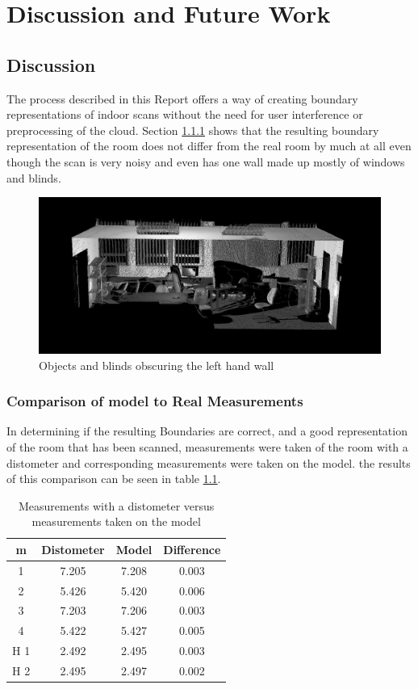 \chapter{Discussion and Future Work}
\section{Discussion}
	\label{discussion}
	The process described in this Report offers a way of creating boundary representations of indoor scans without the need for user interference or preprocessing of the cloud. Section \ref{Comparison} shows that the resulting boundary representation of the room does not differ from the real room by much at all even though the scan is very noisy and even has one wall made up mostly of windows and blinds. 
	
	\begin{figure}[H]
	\centering
	\includegraphics[width=0.9\linewidth]{"Includes/images/Results/Messy Wall"}
	\caption{Objects and blinds obscuring the left hand wall}
	\label{fig:MessyWall}
	\end{figure}
	
	
	\subsection{Comparison of model to Real Measurements}
		\label{Comparison}
		In determining if the resulting Boundaries are correct, and a good representation of the room that has been scanned, measurements were taken of the room with a distometer and corresponding measurements were taken on the model. the results of this comparison can be seen in table \ref{MeasurmensTable}. 
		
		\begin{table}[H]
			\centering
			\begin{tabular}{|c|c|c|c|}
				\hline m & Distometer & Model & Difference \\ 
				\hline 1 & 7.205 & 7.208 & 0.003 \\ 
				\hline 2 & 5.426 & 5.420 & 0.006 \\ 
				\hline 3 & 7.203 & 7.206 & 0.003 \\ 
				\hline 4 & 5.422 & 5.427 & 0.005 \\ 
				\hline H 1 & 2.492 & 2.495 & 0.003 \\ 
				\hline H 2 & 2.495 & 2.497 & 0.002 \\ %
				\hline
			\end{tabular}
			\caption{Measurements with a distometer versus measurements taken on the model}
			\label{MeasurmensTable}
		\end{table}
		
